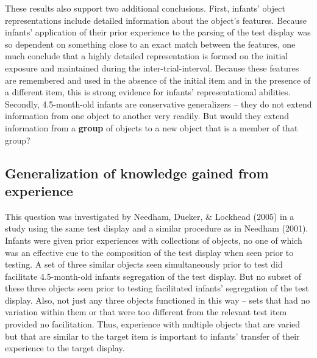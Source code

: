 These results also support two additional conclusions.  First,
infants' object representations include detailed information
about the object's features.  Because infants'
application of their prior experience to the parsing of the test
display was so dependent on something close to an exact match between
the features, one much conclude that a highly detailed representation
is formed on the initial exposure and maintained during the
inter-trial-interval.  Because these features are remembered and used
in the absence of the initial item and in the presence of a different
item, this is strong evidence for infants' representational
abilities.  Secondly, 4.5-month-old infants are conservative
generalizers -- they do not extend information from one object to
another very readily.  But would they extend information from a {\bf group}
of objects to a new object that is a member of that group?


\subsection{Generalization of knowledge gained from experience}

This question was investigated by Needham, Dueker, \& Lockhead (2005)
in a study using the same test display and a similar procedure as in
Needham (2001).  Infants were given prior experiences with collections
of objects, no one of which was an effective cue to the composition of
the test display when seen prior to testing.  A set of three similar
objects seen simultaneously prior to test did facilitate 4.5-month-old
infants segregation of the test display.  But no subset of these three
objects seen prior to testing facilitated infants' segregation
of the test display.  Also, not just any three objects functioned in
this way -- sets that had no variation within them or that were
too different from the relevant test item provided no facilitation.
Thus, experience with multiple objects that are varied but that are
similar to the target item is important to infants' transfer
of their experience to the target display.



